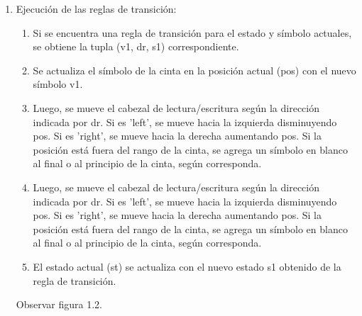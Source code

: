 \begin{enumerate}
    \item Ejecución de las reglas de transición:\newline
    \begin{enumerate}
        \item Si se encuentra una regla de transición para el estado y símbolo actuales, se obtiene la tupla (v1, dr, s1) correspondiente.\newline
        \item Se actualiza el símbolo de la cinta en la posición actual (pos) con el nuevo símbolo v1.\newline
        \item Luego, se mueve el cabezal de lectura/escritura según la dirección indicada por dr. Si es 'left', se mueve hacia la izquierda disminuyendo pos. Si es 'right', se mueve hacia la derecha aumentando pos. Si la posición está fuera del rango de la cinta, se agrega un símbolo en blanco al final o al principio de la cinta, según corresponda.\newline
        \item Luego, se mueve el cabezal de lectura/escritura según la dirección indicada por dr. Si es 'left', se mueve hacia la izquierda disminuyendo pos. Si es 'right', se mueve hacia la derecha aumentando pos. Si la posición está fuera del rango de la cinta, se agrega un símbolo en blanco al final o al principio de la cinta, según corresponda.\newline
        \item El estado actual (st) se actualiza con el nuevo estado s1 obtenido de la regla de transición.\newline
    \end{enumerate}
     Observar figura 1.2.
\end{enumerate}
